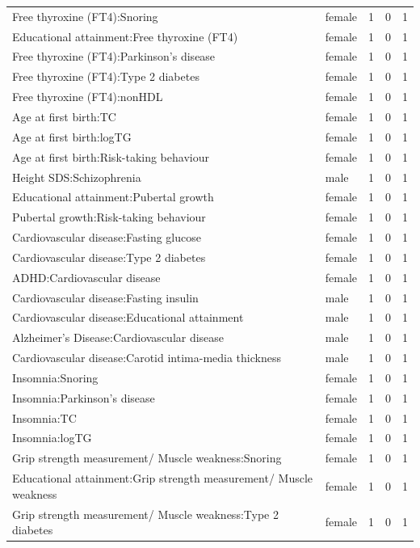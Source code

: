 \begin{table}[ht]
\begin{tabular}{llrrr}
  Free thyroxine (FT4):Snoring & female &   1 &   0 &   1 \\ 
  Educational attainment:Free thyroxine (FT4) & female &   1 &   0 &   1 \\ 
  Free thyroxine (FT4):Parkinson's disease & female &   1 &   0 &   1 \\ 
  Free thyroxine (FT4):Type 2 diabetes & female &   1 &   0 &   1 \\ 
  Free thyroxine (FT4):nonHDL & female &   1 &   0 &   1 \\ 
  Age at first birth:TC & female &   1 &   0 &   1 \\ 
  Age at first birth:logTG & female &   1 &   0 &   1 \\ 
  Age at first birth:Risk-taking behaviour & female &   1 &   0 &   1 \\ 
  Height SDS:Schizophrenia & male &   1 &   0 &   1 \\ 
  Educational attainment:Pubertal growth & female &   1 &   0 &   1 \\ 
  Pubertal growth:Risk-taking behaviour & female &   1 &   0 &   1 \\ 
  Cardiovascular disease:Fasting glucose & female &   1 &   0 &   1 \\ 
  Cardiovascular disease:Type 2 diabetes & female &   1 &   0 &   1 \\ 
  ADHD:Cardiovascular disease & female &   1 &   0 &   1 \\ 
  Cardiovascular disease:Fasting insulin & male &   1 &   0 &   1 \\ 
  Cardiovascular disease:Educational attainment & male &   1 &   0 &   1 \\ 
  Alzheimer's Disease:Cardiovascular disease & male &   1 &   0 &   1 \\ 
  Cardiovascular disease:Carotid intima-media thickness & male &   1 &   0 &   1 \\ 
  Insomnia:Snoring & female &   1 &   0 &   1 \\ 
  Insomnia:Parkinson's disease & female &   1 &   0 &   1 \\ 
  Insomnia:TC & female &   1 &   0 &   1 \\ 
  Insomnia:logTG & female &   1 &   0 &   1 \\ 
  Grip strength measurement/ Muscle weakness:Snoring & female &   1 &   0 &   1 \\ 
  Educational attainment:Grip strength measurement/ Muscle weakness & female &   1 &   0 &   1 \\ 
  Grip strength measurement/ Muscle weakness:Type 2 diabetes & female &   1 &   0 &   1 \\ 

\end{tabular}
\end{table}
